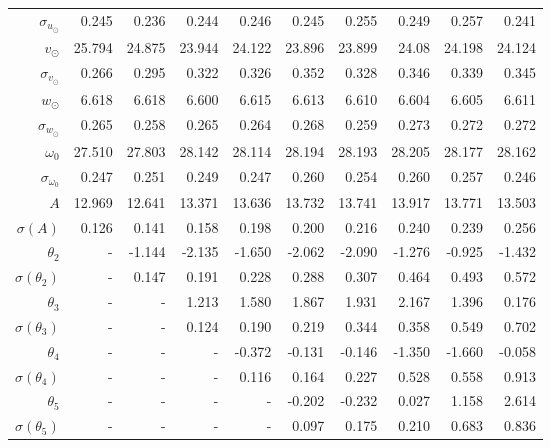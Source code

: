 \documentclass{matmex-diploma-custom}
\begin{document}
\begin{table}[h!!]
\begin{tabular}{r|rr|rrr|rrrr}
 $\sigma_{u_{\odot}} $&0.245       &    0.236 &    0.244 &    0.246 &    0.245 &    0.255 &    0.249 &    0.257 &    0.241 \\
 $v_{\odot} $& 25.794      &   24.875 &   23.944 &   24.122 &   23.896 &   23.899 &    24.08 &   24.198 &   24.124 \\
 $\sigma_{v_{\odot}}$&0.266       &    0.295 &    0.322 &    0.326 &    0.352 &    0.328 &    0.346 &    0.339 &    0.345 \\
 $w_{\odot} $& 6.618       &    6.618 &      6.600 &    6.615 &    6.613 &     6.610 &    6.604 &    6.605 &    6.611 \\
 $\sigma_{w_{\odot}}$&0.265       &    0.258 &    0.265 &    0.264 &    0.268 &    0.259 &    0.273 &    0.272 &    0.272 \\
 $\omega_0 $&27.510      &   27.803 &   28.142 &   28.114 &   28.194 &   28.193 &   28.205 &   28.177 &   28.162 \\
 $\sigma_{\omega_0} $& 0.247       &    0.251 &    0.249 &    0.247 &     0.260 &    0.254 &     0.260 &    0.257 &    0.246 \\\hline
 $A $&12.969      &   12.641 &   13.371 &   13.636 &   13.732 &   13.741 &   13.917 &   13.771 &   13.503 \\
 $\sigma(A) $ & 0.126       &    0.141 &    0.158 &    0.198 &      0.200 &    0.216 &     0.240 &    0.239 &    0.256 \\
 $\theta_2$&-        &  -1.144 &   -2.135 &    -1.650 &   -2.062 &    -2.090 &   -1.276 &   -0.925 &   -1.432 \\
 $\sigma(\theta_2)$&-      &    0.147 &    0.191 &    0.228 &    0.288 &    0.307 &    0.464 &    0.493 &    0.572 \\
 $\theta_3$&-      &    - &   1.213 &    1.580 &    1.867 &    1.931 &    2.167 &    1.396 &    0.176 \\
 $\sigma(\theta_3)$&-      &    - &   0.124 &    0.190 &    0.219 &    0.344 &    0.358 &    0.549 &    0.702 \\
 $\theta_4$&-      &    - &    - &  -0.372 &   -0.131 &   -0.146 &   -1.350 &   -1.660 &   -0.058 \\
 $\sigma(\theta_4)$&-      &    - &    - &    0.116 &    0.164 &    0.227 &    0.528 &    0.558 &    0.913 \\
 $\theta_5$&-      &    - &    - &    - &  -0.202 &   -0.232 &    0.027 &    1.158 &    2.614 \\
 $\sigma(\theta_5)$&-      &    - &    - &    - &    0.097 &    0.175 &    0.210 &    0.683 &    0.836 \\

\end{tabular}
\end{table}
\end{document}
